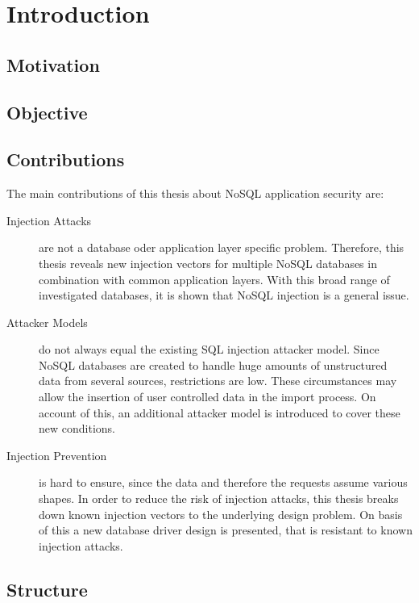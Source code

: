\chapter{Introduction}
\label{cha:introduction}

\section{Motivation}

\section{Objective}

\section{Contributions}

The main contributions of this thesis about NoSQL application security are:
\begin{description}
\item [Injection Attacks] are not a database oder application layer specific problem. Therefore, this thesis reveals new injection vectors for multiple NoSQL databases in combination with common application layers. With this broad range of investigated databases, it is shown that NoSQL injection is a general issue.
\item [Attacker Models] do not always equal the existing SQL injection attacker model. Since NoSQL databases are created to handle huge amounts of unstructured data from several sources, restrictions are low. These circumstances may allow the insertion of user controlled data in the import process. On account of this, an additional attacker model is introduced to cover these new conditions.
\item [Injection Prevention] is hard to ensure, since the data and therefore the requests assume various shapes. In order to reduce the risk of injection attacks, this thesis breaks down known injection vectors to the underlying design problem. On basis of this a new database driver design is presented, that is resistant to known injection attacks.
\end{description}

\section{Structure}
